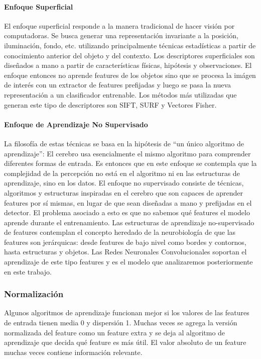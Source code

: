 \documentclass[a4paper,11pt,spanish]{book}
\begin{document}
	  \paragraph{Enfoque Superficial}
	    El enfoque superficial responde a la manera tradicional de hacer visión por computadoras. Se busca generar una representación invariante a la posición, iluminación, fondo,
	    etc. utilizando principalmente técnicas estadísticas a partir de conocimiento anterior del objeto y del contexto. Los descriptores superficiales son diseñados a mano a 
	    partir de características físicas, hipótesis y observaciones. El enfoque entonces no aprende features de los objetos sino que se procesa la imágen de interés con un 
	    extractor de features prefijadas y luego se pasa la nueva representación a un clasificador entrenable. Los métodos más utilizadas que generan este tipo de descriptores son SIFT, SURF y Vectores Fisher.
	  \paragraph{Enfoque de Aprendizaje No Supervisado} 
	    La filosofía de estas técnicas se basa en la hipótesis de “un único algoritmo de aprendizaje”: El cerebro usa esencialmente el mismo algoritmo para comprender diferentes formas de entrada. 
	    Es entonces que en este enfoque se contempla que la complejidad de la percepción no está en el algoritmo ni en las estructuras de aprendizaje, sino en los datos. 
	    El enfoque no supervisado consiste de técnicas, algoritmos y estructuras inspiradas en el cerebro que son capaces de aprender features por sí mismas, 
	    en lugar de que sean diseñadas a mano y prefijadas en el detector. El problema asociado a esto es que no sabemos qué features el modelo aprende durante el entrenamiento.
	    Las estructuras de aprendizaje no-supervisado de features contemplan el concepto heredado de la neurobiología de que las features son jerárquicas: 
	    desde features de bajo nivel como bordes y contornos, hasta estructuras y objetos. Las Redes Neuronales Convolucionales soportan el aprendizaje de este tipo features 
	    y es el modelo que analizaremos posteriormente en este trabajo.


      \subsubsection{Normalización}
	Algunos algoritmos de aprendizaje funcionan mejor si los valores de las features de entrada tienen media 0 y dispersión 1.
	Muchas veces se agrega la versión normalizada del feature como un feature extra y se deja al algoritmo de aprendizaje que decida qué feature es más útil.
	El valor absoluto de un feature muchas veces contiene información relevante.
\end{document}
